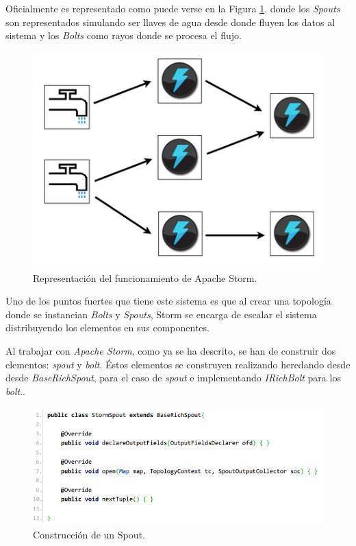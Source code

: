 Oficialmente es representado como puede verse en la Figura \ref{fig:stormBeLike}. donde los \textit{Spouts} son representados simulando ser llaves de agua desde donde fluyen los datos al sistema y los \textit{Bolts} como rayos donde se procesa el flujo.

\begin{figure}[H]
	\centering
	\captionsetup{justification=centering}
	\includegraphics[scale=0.6]{images/stormBeLike.png}
	\caption[Representación del funcionamiento de Apache Storm.]{Representación del funcionamiento de Apache Storm.}
	\label{fig:stormBeLike}
\end{figure}

Uno de los puntos fuertes que tiene este sistema es que al crear una topología donde se instancian \textit{Bolts} y \textit{Spouts}, Storm se encarga de escalar el sistema distribuyendo los elementos en sus componentes.

Al trabajar con \textit{Apache Storm}, como ya se ha descrito, se han de construir dos elementos: \textit{spout} y \textit{bolt}. Éstos elementos se construyen realizando heredando desde desde \textit{BaseRichSpout}, para el caso de \textit{spout} e implementando \textit{IRichBolt} para los \textit{bolt}..

\begin{figure}[H]
	\centering
	\captionsetup{justification=centering}
	\includegraphics[scale=0.8]{images/SpoutBase.png}
	\caption[Construcción de un Spout.]{Construcción de un Spout.}
	\label{fig:spoutbase}
\end{figure}

